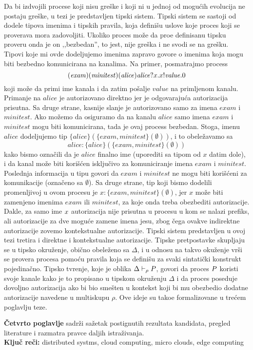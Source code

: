 Da bi izdvojili procese koji nisu gre\v ske i koji ni u jednoj od mogu\' cih evolucija ne postaju gre\v ske, u tezi je predstavljen tipski sistem. Tipski sistem se sastoji od dodele tipova imenima i tipskih pravila, koja defini\v su uslove koje proces koji se proverava mora zadovoljiti. Ukoliko proces mo\v ze da pro\dj e definisanu tipsku proveru onda je on ,,bezbedan'', to jest, nije gre\v ska i ne svodi se na gre\v sku. Tipovi koje mi ovde dodeljujemo imenima zapravo govore o imenima koja mogu biti bezbedno komunicirana na kanalima. 
Na primer, posmatrajmo process
$$
(\mathit{exam})(\mathit{minitest})
(\mathit{alice})\mathit{alice}?x.
x!\mathit{value}. 0
$$
koji mo\v ze da primi ime kanala i da zatim po\v salje  $\mathit{value}$ na primljenom kanalu. Primanje na $\mathit{alice}$ je autorizovano direktno jer je odgovaraju\' ca autorizacija prisutna. Sa druge strane, kasnije slanje je autorizovano samo za imena  $\mathit{exam}$ i $\mathit{minitest}$. Ako mo\v zemo da osiguramo da na kanalu $\mathit{alice}$ samo imena $\mathit{exam}$ i $\mathit{minitest}$ mogu biti komunicirana, tada je ovaj process bezbedan.
Stoga, imenu  $\mathit{alice}$ dodeljujemo tip 
 $ \{\mathit{alice}\}( \{\mathit{exam},\mathit{minitest}\} ( \emptyset ))$, i to obele\v zavamo sa 
 $$\mathit{alice}:\{\mathit{alice}\}( \{\mathit{exam},\mathit{minitest}\} ( \emptyset ))$$ 
 kako bismo ozna\v cili  da je $\mathit{alice}$ finalno ime (uporediti sa tipom od $x$ datim dole), i da 
kanal mo\v ze biti kori\v s\' cen isklju\v civo za komuniciranje imena $\mathit{exam}$ i $\mathit{minitest}$.  Poslednja informacija u tipu govori da $\mathit{exam}$  i $\mathit{minitest}$
ne mogu biti kori\v s\' ceni za komunikacije (ozna\v ceno sa $\emptyset$). 
Sa druge strane, tip koji bismo dodelili promenljivoj u ovom procesu je $x:\{\mathit{exam},\mathit{minitest}\} ( \emptyset )$, jer $x$ mo\v ze biti zamenjeno imenima $\mathit{exam}$ ili $\mathit{minitest}$, za koje onda treba obezbediti autorizacije. Dakle, za samo ime $x$ autorizacija nije prisutna u procesu u kom se nalazi prefiks, ali autorizacije za dve mogu\' ce zamene imena jesu, zbog \v cega ovakve indirektne autorizacije zovemo kontekstualne autorizacije. Tipski sistem predstavljen u ovoj tezi tretira i direktne i kontekstualne autorizacije. Tipske pretpostavke skupljaju se u tipsko okru\v zenje, obi\v cno obele\v zeno sa $\Delta$, i u odnosu na takvo oku\v zenje vr\v si se provera procesa pomo\' cu pravila koja se defini\v su za svaki sintati\v cki konstrukt pojedina\v cno. Tipsko tvr\dj enje, koje je oblika $\Delta\vdash_\rho P$, govori da proces $P$ koristi svoje kanale kako je to propisano u tipskom okru\v zenju $\Delta$ i da proces poseduje dovoljno autorizacija ako bi bio sme\v sten u kontekst koji bi mu obezbedio dodatne autorizacije navedene u multiskupu $\rho$. Ove ideje su tako\dj e formalizovane u tre\' cem poglavlju teze. 


{\bf \v Cetvrto poglavlje} sadr\v zi sa\v zetak postignutih rezultata kandidata, pregled literature i razmatra pravce daljih istra\v zivanja.\\
\newline
\textbf{Klju\v c re\v ci:} distributed systms, cloud computing, micro clouds, edge computing
